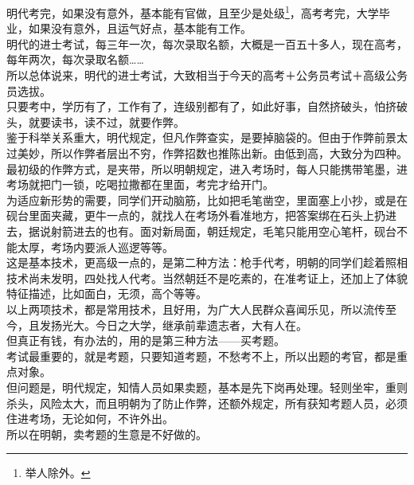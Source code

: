 \begin{multicols}{\theparacolNo}
明代考完，如果没有意外，基本能有官做，且至少是处级\footnote{举人除外。}，高考考完，大学毕业，如果没有意外，且运气好点，基本能有工作。\\

明代的进士考试，每三年一次，每次录取名额，大概是一百五十多人，现在高考，每年两次，每次录取名额……\\

所以总体说来，明代的进士考试，大致相当于今天的高考＋公务员考试＋高级公务员选拔。\\

只要考中，学历有了，工作有了，连级别都有了，如此好事，自然挤破头，怕挤破头，就要读书，读不过，就要作弊。\\

鉴于科举关系重大，明代规定，但凡作弊查实，是要掉脑袋的。但由于作弊前景太过美妙，所以作弊者层出不穷，作弊招数也推陈出新。由低到高，大致分为四种。\\

最初级的作弊方式，是夹带，所以明朝规定，进入考场时，每人只能携带笔墨，进考场就把门一锁，吃喝拉撒都在里面，考完才给开门。\\

为适应新形势的需要，同学们开动脑筋，比如把毛笔凿空，里面塞上小抄，或是在砚台里面夹藏，更牛一点的，就找人在考场外看准地方，把答案绑在石头上扔进去，据说射箭进去的也有。面对新局面，朝廷规定，毛笔只能用空心笔杆，砚台不能太厚，考场内要派人巡逻等等。\\

这是基本技术，更高级一点的，是第二种方法：枪手代考，明朝的同学们趁着照相技术尚未发明，四处找人代考。当然朝廷不是吃素的，在准考证上，还加上了体貌特征描述，比如面白，无须，高个等等。\\

以上两项技术，都是常用技术，且好用，为广大人民群众喜闻乐见，所以流传至今，且发扬光大。今日之大学，继承前辈遗志者，大有人在。\\

但真正有钱，有办法的，用的是第三种方法——买考题。\\

考试最重要的，就是考题，只要知道考题，不愁考不上，所以出题的考官，都是重点对象。\\

但问题是，明代规定，知情人员如果卖题，基本是先下岗再处理。轻则坐牢，重则杀头，风险太大，而且明朝为了防止作弊，还额外规定，所有获知考题人员，必须住进考场，无论如何，不许外出。\\

所以在明朝，卖考题的生意是不好做的。\\


\end{multicols}

